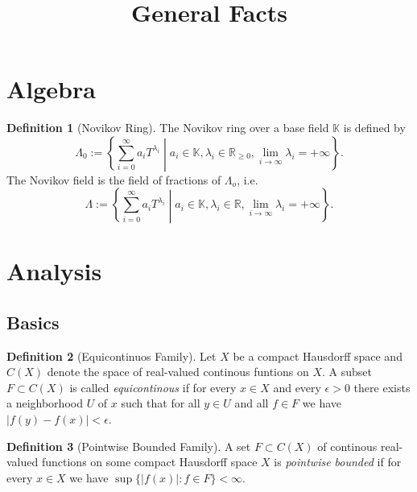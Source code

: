 \documentclass[a4paper]{article}
\title{General Facts}
\newcommand{\RR}{\mathbb{R}}
\newcommand{\KK}{\mathbb{K}}
\theoremstyle{definition}
\theoremstyle{definition}
\newtheorem{definition}{Definition}
\theoremstyle{remark}
\theoremstyle{remark}
\theoremstyle{remark}
\begin{document}
\maketitle 

\tableofcontents

\section{Algebra}

\begin{definition}[Novikov Ring]
  The Novikov ring over a base field $\KK$ is defined by
  \begin{equation*}
    \Lambda_0:=\left\{\sum_{i=0}^{\infty}a_iT^{\lambda_i}\middle|a_i\in\KK,\lambda_i\in\RR_{\geq 0},\lim_{i\to\infty}\lambda_i=+\infty\right\}.
  \end{equation*}
  The Novikov field is the field of fractions of $\Lambda_o$, i.e.\ 
  \begin{equation*}
    \Lambda:=\left\{\sum_{i=0}^{\infty}a_iT^{\lambda_i}\middle|a_i\in\KK,\lambda_i\in\RR,\lim_{i\to\infty}\lambda_i=+\infty\right\}.
  \end{equation*}
\end{definition}

\section{Analysis}

\subsection{Basics}

\begin{definition}[Equicontinuos Family]
  Let $X$ be a compact Hausdorff space and $C(X)$ denote the space of real-valued continous funtions on $X$. A subset $F\subset C(X)$ is called \emph{equicontinous} if for every $x\in X$ and every $\epsilon>0$ there exists a neighborhood $U$ of $x$ such that for all $y\in U$ and all $f\in F$ we have $|f(y)-f(x)|<\epsilon$.
\end{definition}

\begin{definition}[Pointwise Bounded Family]
  A set $F\subset C(X)$ of continous real-valued functions on some compact Hausdorff space $X$ is \emph{pointwise bounded} if for every $x\in X$ we have $\sup\{|f(x)|:f\in F\}<\infty$.
\end{definition}
\end{document}
